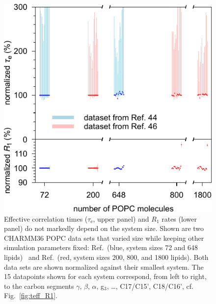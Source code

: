 \documentclass[journal=jcisd8,manuscript=article,layout=twocolumn]{achemso}
\begin{document}
\begin{figure}[t]
	\includegraphics[width=\columnwidth]{../Figs/systemSize.pdf} 
	\caption{Effective correlation times ($\tau_\mathrm e$, upper panel)
	and $R_1$ rates (lower panel) do not markedly depend on the system size.
	Shown are two CHARMM36 POPC data sets that varied size while keeping other simulation parameters fixed:
	Ref.\, (blue, system sizes 72 and 648 lipids)~\cite{Venable:2015a} and
	Ref.\, (red, system sizes 200, 800, and 1800 lipids).
	Both data sets are shown normalized against their smallest system.
	The 15 datapoints shown for each system correspond, from left to right,
	to the carbon segments $\gamma$, $\beta$, $\alpha$, g$_3$, \ldots, C17/C15', C18/C16',
	cf. Fig.~\ref{fig:teff_R1}.
	}
	\label{fig:systemSize}
\end{figure} 
\end{document}
